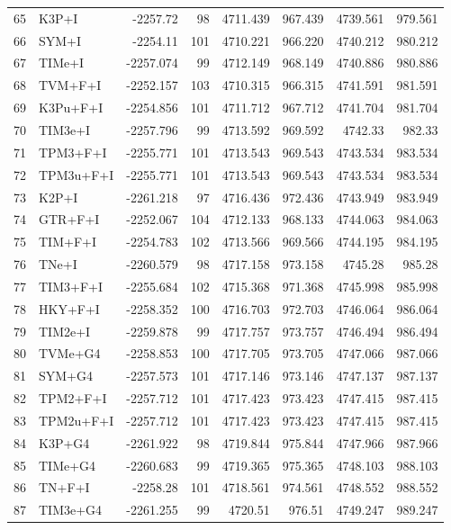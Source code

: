 \begin{longtable}{clrrrrrr}
	65 & K3P+I & -2257.72 & 98 & 4711.439 & 967.439 & 4739.561 & 979.561 \\ 
	66 & SYM+I & -2254.11 & 101 & 4710.221 & 966.220 & 4740.212 & 980.212 \\ 
	67 & TIMe+I & -2257.074 & 99 & 4712.149 & 968.149 & 4740.886 & 980.886 \\ 
	68 & TVM+F+I & -2252.157 & 103 & 4710.315 & 966.315 & 4741.591 & 981.591 \\ 
	69 & K3Pu+F+I & -2254.856 & 101 & 4711.712 & 967.712 & 4741.704 & 981.704 \\ 
	70 & TIM3e+I & -2257.796 & 99 & 4713.592 & 969.592 & 4742.33 & 982.33 \\ 
	71 & TPM3+F+I & -2255.771 & 101 & 4713.543 & 969.543 & 4743.534 & 983.534 \\ 
	72 & TPM3u+F+I & -2255.771 & 101 & 4713.543 & 969.543 & 4743.534 & 983.534 \\ 
	73 & K2P+I & -2261.218 & 97 & 4716.436 & 972.436 & 4743.949 & 983.949 \\ 
	74 & GTR+F+I & -2252.067 & 104 & 4712.133 & 968.133 & 4744.063 & 984.063 \\ 
	75 & TIM+F+I & -2254.783 & 102 & 4713.566 & 969.566 & 4744.195 & 984.195 \\ 
	76 & TNe+I & -2260.579 & 98 & 4717.158 & 973.158 & 4745.28 & 985.28 \\ 
	77 & TIM3+F+I & -2255.684 & 102 & 4715.368 & 971.368 & 4745.998 & 985.998 \\ 
	78 & HKY+F+I & -2258.352 & 100 & 4716.703 & 972.703 & 4746.064 & 986.064 \\ 
	79 & TIM2e+I & -2259.878 & 99 & 4717.757 & 973.757 & 4746.494 & 986.494 \\ 
	80 & TVMe+G4 & -2258.853 & 100 & 4717.705 & 973.705 & 4747.066 & 987.066 \\ 
	81 & SYM+G4 & -2257.573 & 101 & 4717.146 & 973.146 & 4747.137 & 987.137 \\ 
	82 & TPM2+F+I & -2257.712 & 101 & 4717.423 & 973.423 & 4747.415 & 987.415 \\ 
	83 & TPM2u+F+I & -2257.712 & 101 & 4717.423 & 973.423 & 4747.415 & 987.415 \\ 
	84 & K3P+G4 & -2261.922 & 98 & 4719.844 & 975.844 & 4747.966 & 987.966 \\ 
	85 & TIMe+G4 & -2260.683 & 99 & 4719.365 & 975.365 & 4748.103 & 988.103 \\ 
	86 & TN+F+I & -2258.28 & 101 & 4718.561 & 974.561 & 4748.552 & 988.552 \\ 
	87 & TIM3e+G4 & -2261.255 & 99 & 4720.51 & 976.51 & 4749.247 & 989.247 \\ 

\end{longtable}
